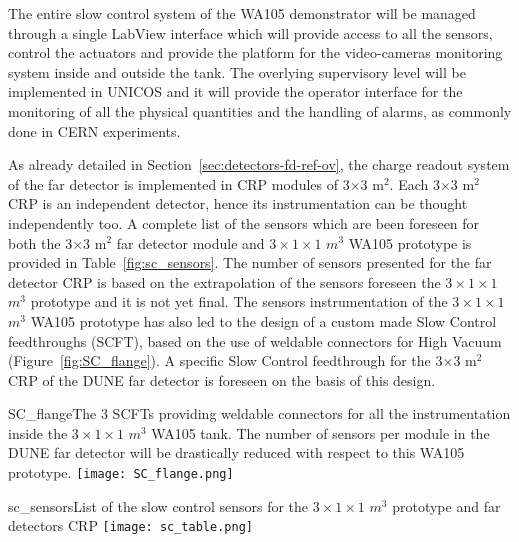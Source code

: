The entire slow control system of the WA105 demonstrator will be managed through a single LabView  interface which will provide access to all the sensors, control the actuators and provide the platform for the video-cameras monitoring system inside and outside the tank.  The overlying supervisory level  will be implemented in UNICOS and it will provide the operator interface for the monitoring of all the physical quantities and the handling of alarms, as commonly done in CERN experiments.  

As already detailed in Section~\ref{sec:detectors-fd-ref-ov}, the charge readout system of the far detector is implemented in CRP modules of 3$\times$3 m$^2$. Each 3$\times$3 m$^2$ CRP is an independent detector, hence its instrumentation can be thought independently too. A complete list of the sensors which are been foreseen for both the 3$\times$3 m$^2$ far detector module and $3 \times 1 \times 1$ $m^3$ WA105 prototype  is provided in Table~\ref{fig:sc_sensors}. The number of sensors presented for the far detector CRP is  based on the extrapolation of the sensors foreseen the $3 \times 1 \times 1$ $m^3$ prototype and it is not yet final.  The sensors instrumentation of the $3 \times 1 \times 1$ $m^3$ WA105 prototype  has also led to the design of a custom made Slow Control feedthroughs (SCFT), based on the use of weldable connectors for High Vacuum (Figure~\ref{fig:SC_flange}). A specific Slow Control feedthrough for the 3$\times$3 m$^2$ CRP of the DUNE far detector is foreseen on the basis of this design.

\begin{cdrfigure}{SC_flange}{The 3 SCFTs providing weldable connectors for all the instrumentation inside the  $3 \times 1 \times 1$ $m^3$  WA105 tank. The number of sensors per module in the DUNE far detector will be drastically reduced with respect to this WA105 prototype.}
  \texttt{[image: SC\_flange.png]}
 \end{cdrfigure}

\begin{cdrfigure}{sc_sensors}{List of the slow control sensors for the $3 \times 1 \times 1$ $m^3$ prototype and far detectors CRP}
 \texttt{[image: sc\_table.png]} %
 \end{cdrfigure}
   